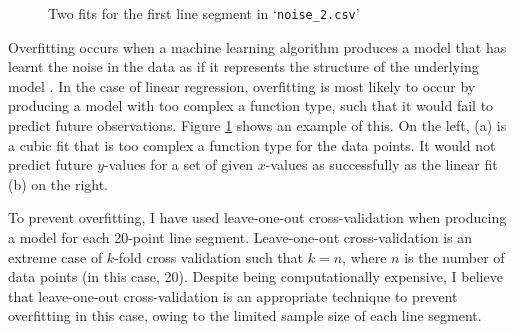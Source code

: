 \documentclass[onecolumn, 12pt, a4paper]{article}
\begin{document}
\begin{figure}[htbp]
    \centering
    \hfill
    \caption{Two fits for the first line segment in `\texttt{noise\_2.csv}'}
    \label{fig:noise_2.csv}
\end{figure}

Overfitting occurs when a machine learning algorithm
produces a model that has learnt the noise in the data
as if it represents the structure of the underlying
model \cite{MSMI}.
In the case of linear regression, overfitting is most
likely to occur by producing a model with too complex a function
type, such that it would fail to predict future observations.
Figure \ref{fig:noise_2.csv} shows an example of this. 
On the left, (a) is a cubic fit that is too complex a 
function type for the data points.
It would not predict future $y$-values for a set of 
given $x$-values as successfully as the linear fit (b) on 
the right.

To prevent overfitting, I have used leave-one-out
cross-validation when producing a model for each 20-point
line segment. Leave-one-out cross-validation is 
an extreme case of $k$-fold cross validation
such that $k = n$, where
$n$ is the number of data points (in this case, 20).
Despite being computationally expensive, I believe that
leave-one-out cross-validation is an appropriate technique
to prevent overfitting in this case,
owing to the limited sample size of each line segment.
\end{document}
